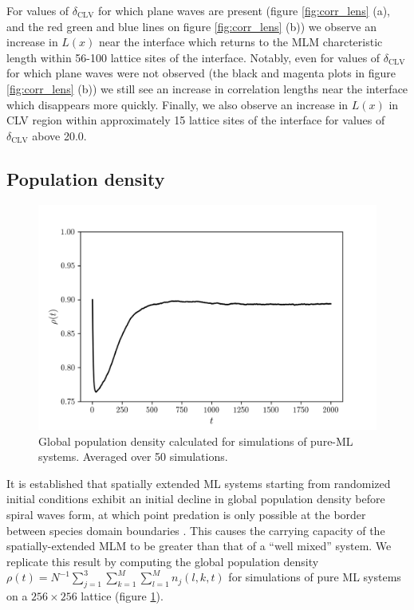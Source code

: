 \documentclass[12pt]{article}
\begin{document}
For values of $ \delta_{\mathrm{CLV}} $ for which plane waves are present (figure \ref{fig:corr_lens} (a), and the
red green and blue lines on figure \ref{fig:corr_lens} (b)) we observe an increase in $ L(x) $ near the interface
which returns to the MLM charcteristic length within 56-100 lattice sites of the interface. Notably, even for 
values of $ \delta_{\mathrm{CLV}} $ for which plane waves were not observed (the black and magenta plots in figure \ref{fig:corr_lens} (b))
we still see an increase in correlation lengths near the interface which disappears more quickly. Finally, we also 
observe an increase in $ L(x) $ in CLV region within approximately 15 lattice sites
of the interface for values of $ \delta_{\mathrm{CLV}} $ above 20.0.

\subsection{Population density}%
\label{sub:density}

\begin{figure}[h]
    \centering
    \includegraphics[width=0.8\linewidth]{images/net_density.png} 
    \caption{Global population density calculated for simulations of pure-ML systems. Averaged over 
    50 simulations.} \label{fig:net_den}
\end{figure}

It is established that spatially extended ML systems starting from randomized 
initial conditions exhibit an initial decline in global population density 
before spiral waves form, at which point predation is only possible at the border 
between species domain boundaries \cite{HeMobiliaTauber}. 
This causes the carrying capacity of the spatially-extended MLM to be greater than
that of a ``well mixed'' system. We replicate this result by computing the global population 
density $ \rho(t) = N^{-1} \sum_{j=1}^3\sum_{k=1}^{M}\sum_{l=1}^{M}n_j(l,k,t) $ for simulations of pure ML systems on a $ 256 \times 256 $ lattice (figure \ref{fig:net_den}).
\end{document}
